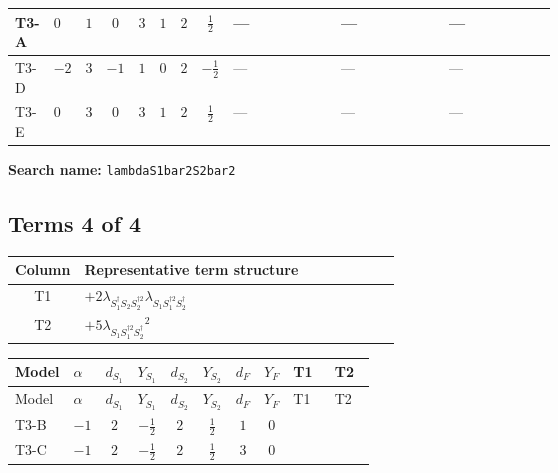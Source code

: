 \documentclass[8pt]{article}
\begin{document}
\begin{landscape}
\begin{longtable}{@{}llcccccc >{\raggedright\arraybackslash}p{0.21\linewidth} >{\raggedright\arraybackslash}p{0.21\linewidth} >{\raggedright\arraybackslash}p{0.21\linewidth}@{}}
\midrule
T3-A & $0$ & $1$ & $0$ & $3$ & $1$ & $2$ & $\frac{1}{2}$ & --- & --- & --- \\
\midrule
T3-D & $-2$ & $3$ & $-1$ & $1$ & $0$ & $2$ & $-\frac{1}{2}$ & --- & --- & --- \\
\midrule
T3-E & $0$ & $3$ & $0$ & $3$ & $1$ & $2$ & $\frac{1}{2}$ & --- & --- & --- \\
\midrule
\bottomrule
\end{longtable}
\clearpage
\noindent\textbf{Search name: }\texttt{lambdaS1bar2S2bar2}\par\smallskip
\subsection*{Terms 4 of 4}
\begin{center}
\begin{tabular}{@{}c >{\raggedright\arraybackslash}p{0.82\linewidth}@{}}
\toprule
Column & Representative term structure \\
\midrule
T1 & \(\displaystyle +2 {\lambda_{S_1^\dagger S_2 S_2^{\dagger 2}}} {\lambda_{S_1 S_1^{\dagger 2}S_2^\dagger}}\) \\
\midrule
T2 & \(\displaystyle +5 {\lambda_{S_1 S_1^{\dagger 2}S_2^\dagger}}^2\) \\
\midrule
\bottomrule
\end{tabular}
\end{center}
\smallskip
\tiny
\begin{longtable}{@{}llcccccc >{\raggedright\arraybackslash}p{0.21\linewidth} >{\raggedright\arraybackslash}p{0.21\linewidth}@{}}
\toprule
Model & $\alpha$ & $d_{S_1}$ & $Y_{S_1}$ & $d_{S_2}$ & $Y_{S_2}$ & $d_F$ & $Y_F$ & T1 & T2 \\
\midrule
\endfirsthead
\toprule
Model & $\alpha$ & $d_{S_1}$ & $Y_{S_1}$ & $d_{S_2}$ & $Y_{S_2}$ & $d_F$ & $Y_F$ & T1 & T2 \\
\midrule
\endhead
T3-B & $-1$ & $2$ & $-\frac{1}{2}$ & $2$ & $\frac{1}{2}$ & $1$ & $0$ & \scriptsize\adjustbox{max width=\linewidth}{$\begin{gathered} +2 {\lambda_{S_1^\dagger S_2 S_2^{\dagger 2}}} {\lambda_{S_1 S_1^{\dagger 2}S_2^\dagger}}\end{gathered}$} & \scriptsize\adjustbox{max width=\linewidth}{$\begin{gathered} +5 {\lambda_{S_1 S_1^{\dagger 2}S_2^\dagger}}^2\end{gathered}$} \\
\midrule
T3-C & $-1$ & $2$ & $-\frac{1}{2}$ & $2$ & $\frac{1}{2}$ & $3$ & $0$ & \scriptsize\adjustbox{max width=\linewidth}{$\begin{gathered} +2 {\lambda_{S_1^\dagger S_2 S_2^{\dagger 2}}} {\lambda_{S_1 S_1^{\dagger 2}S_2^\dagger}}\end{gathered}$} & \scriptsize\adjustbox{max width=\linewidth}{$\begin{gathered} +5 {\lambda_{S_1 S_1^{\dagger 2}S_2^\dagger}}^2\end{gathered}$} \\

\end{longtable}
\end{landscape}
\end{document}

